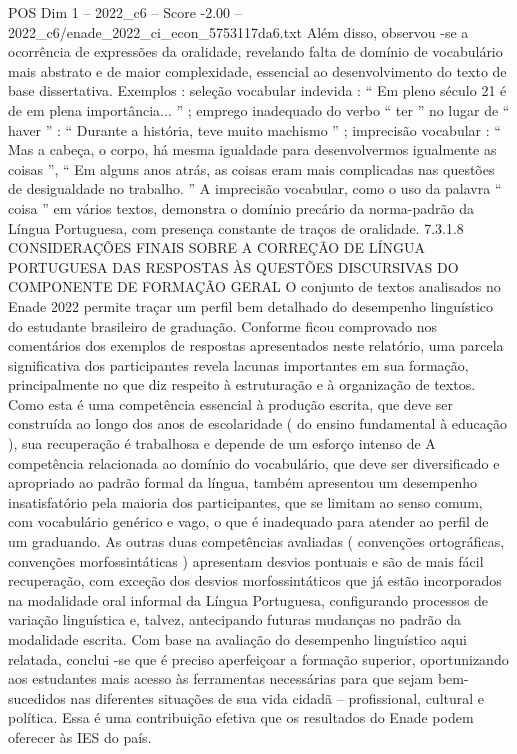 \begin{textsample}{POS Dim 1 – 2022\_c6 – Score -2.00 – 2022\_c6/enade\_2022\_ci\_econ\_5753117da6.txt}
Além disso, observou -se a ocorrência de expressões da oralidade, revelando falta de domínio de vocabulário mais abstrato e de maior complexidade, essencial ao desenvolvimento do texto de base dissertativa.
Exemplos : seleção vocabular indevida : “ Em pleno século 21 é de em plena importância... ” ; emprego inadequado do verbo “ ter ” no lugar de “ haver ” : “ Durante a história, teve muito machismo ” ; imprecisão vocabular : “ Mas a cabeça, o corpo, há mesma igualdade para desenvolvermos igualmente as coisas ”, “ Em alguns anos atrás, as coisas eram mais complicadas nas questões de desigualdade no trabalho. ” A imprecisão vocabular, como o uso da palavra “ coisa ” em vários textos, demonstra o domínio precário da norma-padrão da Língua Portuguesa, com presença constante de traços de oralidade. 7.3.1.8 CONSIDERAÇÕES FINAIS SOBRE A CORREÇÃO DE LÍNGUA PORTUGUESA DAS RESPOSTAS ÀS QUESTÕES DISCURSIVAS DO COMPONENTE DE FORMAÇÃO GERAL O conjunto de textos analisados no Enade 2022 permite traçar um perfil bem detalhado do desempenho linguístico do estudante brasileiro de graduação.
Conforme ficou comprovado nos comentários dos exemplos de respostas apresentados neste relatório, uma parcela significativa dos participantes revela lacunas importantes em sua formação, principalmente no que diz respeito à estruturação e à organização de textos.
Como esta é uma competência essencial à produção escrita, que deve ser construída ao longo dos anos de escolaridade ( do ensino fundamental à educação ), sua recuperação é trabalhosa e depende de um esforço intenso de A competência relacionada ao domínio do vocabulário, que deve ser diversificado e apropriado ao padrão formal da língua, também apresentou um desempenho insatisfatório pela maioria dos participantes, que se limitam ao senso comum, com vocabulário genérico e vago, o que é inadequado para atender ao perfil de um graduando.
As outras duas competências avaliadas ( convenções ortográficas, convenções morfossintáticas ) apresentam desvios pontuais e são de mais fácil recuperação, com exceção dos desvios morfossintáticos que já estão incorporados na modalidade oral informal da Língua Portuguesa, configurando processos de variação linguística e, talvez, antecipando futuras mudanças no padrão da modalidade escrita.
Com base na avaliação do desempenho linguístico aqui relatada, conclui -se que é preciso aperfeiçoar a formação superior, oportunizando aos estudantes mais acesso às ferramentas necessárias para que sejam bem-sucedidos nas diferentes situações de sua vida cidadã – profissional, cultural e política.
Essa é uma contribuição efetiva que os resultados do Enade podem oferecer às IES do país.

\end{textsample}
